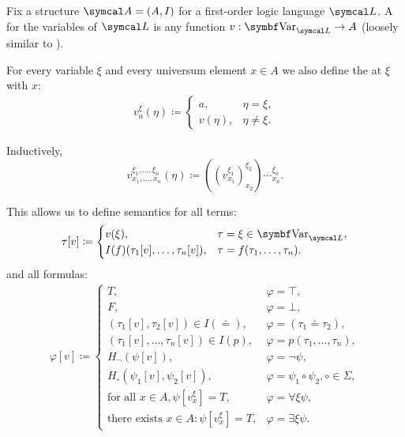 \begin{definition}\label{def:first_order_variable_assignment}\cite[definition 14.32]{OpenLogic20201202}
  Fix a structure \( \Cal{A} = (A, I) \) for a first-order logic language \( \Cal{L} \). A  for the variables of \( \Cal{L} \) is any function \( v: \Cat{Var}_{\Cal{L}} \to A \) (loosely similar to ).

  For every variable \( \xi \) and every universum element \( x \in A \) we also define the  at \( \xi \) with \( x \):
  \begin{align*}
    v_a^\xi(\eta) \coloneqq \begin{cases}
      a,    &\eta = \xi, \\
      v(\eta), &\eta \neq \xi.
    \end{cases}
  \end{align*}

  Inductively,
  \begin{equation*}
    v_{x_1, \ldots, x_n}^{\xi_1, \ldots, \xi_n}(\eta) \coloneqq ((v_{x_1}^{\xi_1})_{x_2}^{\xi_2})\cdots_{x_n}^{\xi_n}.
  \end{equation*}

  This allows us to define semantics for all terms:
  \begin{align*}
    \tau[v] \coloneqq \begin{cases}
      v(\xi),                               &\tau = \xi \in \Cat{Var}_{\Cal{L}}, \\
      I(f)(\tau_1[v], \ldots, \tau_n[v]),   &\tau = f(\tau_1, \ldots, \tau_n).
    \end{cases}
  \end{align*}
  and all formulas:
  \begin{align*}
    \varphi[v] \coloneqq \begin{cases}
      T,                                                &\varphi = \top, \\
      F,                                                &\varphi = \bot, \\
      (\tau_1[v], \tau_2[v]) \in I(\doteq),             &\varphi = (\tau_1 \doteq \tau_2), \\
      (\tau_1[v], \ldots, \tau_n[v]) \in I(p),          &\varphi = p(\tau_1, \ldots, \tau_n), \\
      H_\neg(\psi[v]),                                  &\varphi = \neg \psi, \\
      H_\circ(\psi_1[v], \psi_2[v]),                    &\varphi = \psi_1 \circ \psi_2, \circ \in \Sigma, \\
      \text{for all } x \in A, \psi[v_x^\xi] = T,       &\varphi = \forall \xi \psi, \\
      \text{there exists } x \in A: \psi[v_x^\xi] = T,  &\varphi = \exists \xi \psi.
    \end{cases}
  \end{align*}


\end{definition}
